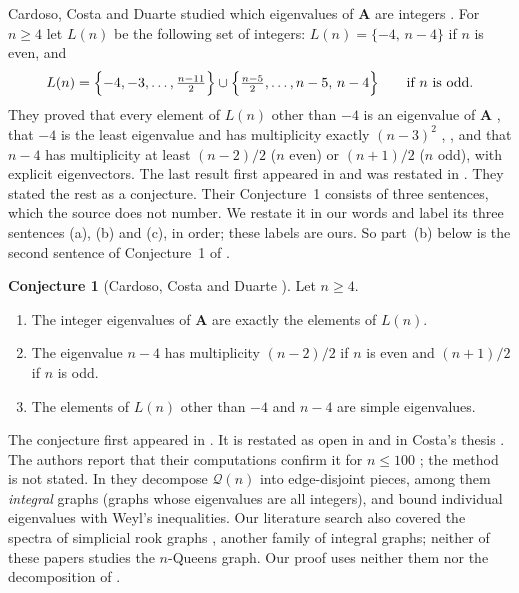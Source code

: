 \documentclass[11pt]{amsart}
\theoremstyle{plain}
\theoremstyle{definition}
\newtheorem*{conjecture}{Conjecture}
\theoremstyle{remark}
\numberwithin{equation}{section}
\newcommand{\QG}{\mathcal{Q}}          %
\newcommand{\Adj}{\mathbf{A}}          %
\begin{document}
Cardoso, Costa and Duarte studied which eigenvalues of \(\Adj\) are integers
\cite{CCD20,CCD23,CCD25}. For \(n\ge4\) let \(L(n)\) be the following set of integers:
\(L(n)=\{-4,\,n-4\}\) if \(n\) is even, and
\[
L(n)=\Bigl\{-4,-3,\dots,\tfrac{n-11}{2}\Bigr\}\cup\Bigl\{\tfrac{n-5}{2},\dots,n-5,\,n-4\Bigr\}
\qquad\text{if \(n\) is odd.}
\]
They proved that every element of \(L(n)\) other than \(-4\) is an eigenvalue of \(\Adj\)
\cite[Sections~3--4]{CCD23}, that \(-4\) is the least eigenvalue and has multiplicity
exactly \((n-3)^2\) \cite[Theorems~3.6 and~3.8]{CCD20}, \cite{CCD22}, and that \(n-4\) has
multiplicity at least \((n-2)/2\) (\(n\) even) or \((n+1)/2\) (\(n\) odd), with explicit
eigenvectors. The last result first appeared in \cite[Theorem~3.10]{CCD20} and was
restated in \cite[Theorem~4.1 and Corollary~4.2]{CCD23}. They stated the rest as a
conjecture. Their Conjecture~1 \cite{CCD23} consists of three sentences, which the source
does not number. We restate it in our words and label its three sentences (a), (b) and
(c), in order; these labels are ours. So part~(b) below is the second sentence of
Conjecture~1 of \cite{CCD23}.

\begin{conjecture}[Cardoso, Costa and Duarte {\cite[Conjecture~1]{CCD23}}]
Let \(n\ge4\).
\begin{enumerate}
\item[(a)] The integer eigenvalues of \(\Adj\) are exactly the elements of \(L(n)\).
\item[(b)] The eigenvalue \(n-4\) has multiplicity \((n-2)/2\) if \(n\) is even and
\((n+1)/2\) if \(n\) is odd.
\item[(c)] The elements of \(L(n)\) other than \(-4\) and \(n-4\) are simple eigenvalues.
\end{enumerate}
\end{conjecture}

The conjecture first appeared in \cite[Conjecture~3]{CCD20}. It is restated as open in
\cite[Conjecture~4.1]{CCD25} and in Costa's thesis \cite{Cos24}. The authors report that
their computations confirm it for \(n\le100\) \cite{CCD20,CCD23}; the method is not
stated. In \cite{CCD25} they decompose \(\QG(n)\) into edge-disjoint pieces, among them
\emph{integral} graphs (graphs whose eigenvalues are all integers), and bound
individual eigenvalues with Weyl's inequalities. Our
literature search also covered the spectra of simplicial rook graphs
\cite{MW15,BCHV16}, another family of integral graphs; neither of these papers studies
the \(n\)-Queens graph. Our proof
uses neither them nor the decomposition of \cite{CCD25}.
\end{document}
